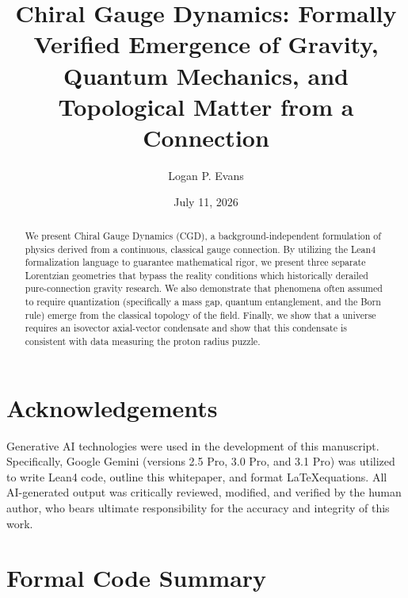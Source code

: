 \documentclass[aps,prd,onecolumn,nofootinbib,11pt,longbibliography]{revtex4-2}
\begin{document}
\title{Chiral Gauge Dynamics: Formally Verified Emergence of Gravity, Quantum Mechanics, and Topological Matter from a \spinFourC Connection}
\author{Logan P. Evans}
\date{July 11, 2026}

\begin{abstract}
  We present Chiral Gauge Dynamics (CGD), a background-independent formulation of physics derived from a continuous, classical \spinFourC gauge connection. By utilizing the Lean4 formalization language to guarantee mathematical rigor, we present three separate Lorentzian geometries that bypass the reality conditions which historically derailed pure-connection gravity research. We also demonstrate that phenomena often assumed to require quantization (specifically a mass gap, quantum entanglement, and the Born rule) emerge from the classical topology of the field. Finally, we show that a \spinFourC universe requires an isovector axial-vector condensate and show that this condensate is consistent with data measuring the proton radius puzzle.
\end{abstract}

\maketitle









\appendix

\section*{Acknowledgements}
Generative AI technologies were used in the development of this manuscript. Specifically, Google Gemini (versions 2.5 Pro, 3.0 Pro, and 3.1 Pro) was utilized to write Lean4 code, outline this whitepaper, and format \LaTeX equations. All AI-generated output was critically reviewed, modified, and verified by the human author, who bears ultimate responsibility for the accuracy and integrity of this work.



\section{Formal Code Summary}
\label{sec:code_summary}

\end{document}
